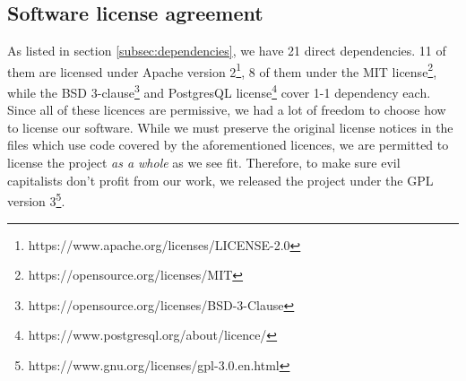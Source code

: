 \documentclass[report/main.tex]{subfiles}
\begin{document}
    \subsection{Software license agreement}
        As listed in section \ref{subsec:dependencies}, we have 21 direct dependencies. 11 of them are licensed under Apache version 2\footnote{https://www.apache.org/licenses/LICENSE-2.0}, 8 of them under the MIT license\footnote{https://opensource.org/licenses/MIT}, while the BSD 3-clause\footnote{https://opensource.org/licenses/BSD-3-Clause} and PostgresQL license\footnote{https://www.postgresql.org/about/licence/} cover 1-1 dependency each. Since all of these licences are permissive, we had a lot of freedom to choose how to license our software. While we must preserve the original license notices in the files which use code covered by the aforementioned licences, we are permitted to license the project \textit{as a whole} as we see fit. Therefore, to make sure evil capitalists don't profit from our work, we released the project under the GPL version 3\footnote{https://www.gnu.org/licenses/gpl-3.0.en.html}.
    
\end{document}
